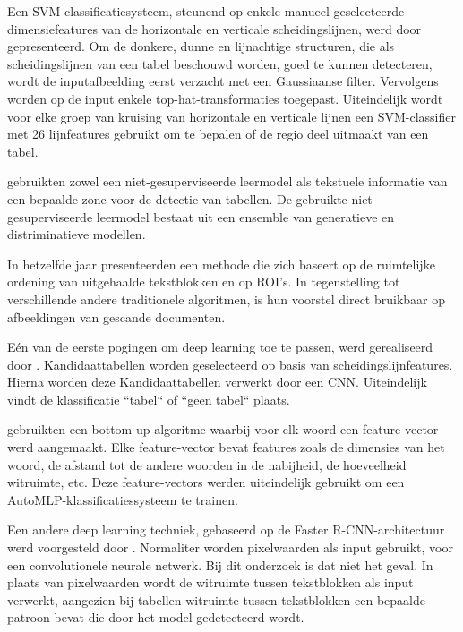 Een \Gls{SVM}-classificatiesysteem, steunend op enkele manueel geselecteerde dimensiefeatures van de horizontale en verticale scheidingslijnen, werd door \textcite{Kasar2013} gepresenteerd. Om de donkere, dunne en lijnachtige structuren, die als scheidingslijnen van een tabel beschouwd worden, goed te kunnen detecteren, wordt de inputafbeelding eerst verzacht met een Gaussiaanse filter. Vervolgens worden op de input enkele top-hat-transformaties toegepast. Uiteindelijk wordt voor elke groep van kruising van horizontale en verticale lijnen een \Gls{SVM}-classifier met 26 lijnfeatures gebruikt om te bepalen of de regio deel uitmaakt van een tabel.

\textcite{Fan2015} gebruikten zowel een niet-gesuperviseerde leermodel als tekstuele informatie van een bepaalde zone voor de detectie van tabellen. De gebruikte niet-gesuperviseerde leermodel bestaat uit een ensemble van generatieve en distriminatieve modellen.

In hetzelfde jaar presenteerden \textcite{Tran2015} een methode die zich baseert op de ruimtelijke ordening van uitgehaalde tekstblokken en op \Gls{ROI}'s. In tegenstelling tot verschillende andere traditionele algoritmen, is hun voorstel direct bruikbaar op afbeeldingen van gescande documenten.

Eén van de eerste pogingen om deep learning toe te passen, werd gerealiseerd door \textcite{Hao2016}. Kandidaattabellen worden geselecteerd op basis van scheidingslijnfeatures. Hierna worden deze Kandidaattabellen verwerkt door een \Gls{CNN}. Uiteindelijk vindt de klassificatie ``tabel`` of ``geen tabel`` plaats.

\textcite{Rashid2017} gebruikten een bottom-up algoritme waarbij voor elk woord een feature-vector werd aangemaakt. Elke feature-vector bevat features zoals de dimensies van het woord, de afstand tot de andere woorden in de nabijheid, de hoeveelheid witruimte, etc. Deze feature-vectors werden uiteindelijk gebruikt om een AutoMLP-klassificatiessysteem te trainen.

Een andere deep learning techniek, gebaseerd op de Faster R-CNN-architectuur werd voorgesteld door \textcite{Gilani2017}. Normaliter worden pixelwaarden als input gebruikt, voor een convolutionele neurale netwerk. Bij dit onderzoek is dat niet het geval. In plaats van pixelwaarden wordt de witruimte tussen tekstblokken als input verwerkt, aangezien bij tabellen witruimte tussen tekstblokken een bepaalde patroon bevat die door het model gedetecteerd wordt.

